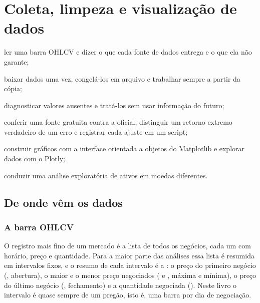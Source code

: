 \chapter{Coleta, limpeza e visualização de dados}
\label{cap:dados}


\begin{objetivos}
  \item ler uma barra OHLCV e dizer o que cada fonte de dados entrega e o que ela não garante;
  \item baixar dados uma vez, congelá-los em arquivo e trabalhar sempre a partir da cópia;
  \item diagnosticar valores ausentes e tratá-los sem usar informação do futuro;
  \item conferir uma fonte gratuita contra a oficial, distinguir um retorno extremo verdadeiro de um erro e registrar cada ajuste em um script;
  \item construir gráficos com a interface orientada a objetos do Matplotlib e explorar dados com o Plotly;
  \item conduzir uma análise exploratória de ativos em moedas diferentes.
\end{objetivos}

\section{De onde vêm os dados}
\label{sec:c02-fontes}

\subsection{A barra OHLCV}

O registro mais fino de um mercado é a lista de todos os negócios, cada um com horário, preço e quantidade. Para a maior parte das análises essa lista é resumida em intervalos fixos, e o resumo de cada intervalo é a : o preço do primeiro negócio (, abertura), o maior e o menor preço negociados ( e , máxima e mínima), o preço do último negócio (, fechamento) e a quantidade negociada (). Neste livro o intervalo é quase sempre de um pregão, isto é, uma barra por dia de negociação.

